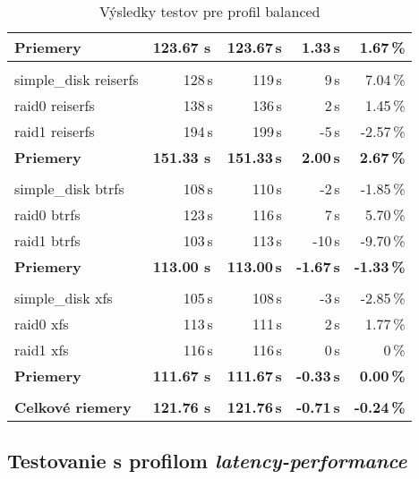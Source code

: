 {\begin{table}[H]
\begin{center}
\begin{tabular}{|l|r r r r|}
    \hline
    \textbf{Priemery} & \textbf{123.67 s}\,& \textbf{123.67\,s} & \textbf{1.33\,s} & \textbf{1.67\,\%} \\
    \hline & \\[-1em]\hline
    simple\_disk reiserfs & 128\,s & 119\,s & 9\,s & 7.04\,\% \\
    raid0 reiserfs & 138\,s & 136\,s & 2\,s & 1.45\,\% \\
    raid1 reiserfs & 194\,s & 199\,s & -5\,s & -2.57\,\% \\
    \hline
    \textbf{Priemery} & \textbf{151.33 s}\,& \textbf{151.33\,s} & \textbf{2.00\,s} & \textbf{2.67\,\%} \\
    \hline & \\[-1em]\hline
    simple\_disk btrfs & 108\,s & 110\,s & -2\,s & -1.85\,\% \\
    raid0 btrfs & 123\,s & 116\,s & 7\,s & 5.70\,\% \\
    raid1 btrfs & 103\,s & 113\,s & -10\,s & -9.70\,\% \\
    \hline
    \textbf{Priemery} & \textbf{113.00 s}\,& \textbf{113.00\,s} & \textbf{-1.67\,s} & \textbf{-1.33\,\%} \\
    \hline & \\[-1em]\hline
    simple\_disk xfs & 105\,s & 108\,s & -3\,s & -2.85\,\% \\
    raid0 xfs & 113\,s & 111\,s & 2\,s & 1.77\,\% \\
    raid1 xfs & 116\,s & 116\,s & 0\,s & 0\,\% \\
    \hline
    \textbf{Priemery} & \textbf{111.67 s}\,& \textbf{111.67\,s} & \textbf{-0.33\,s} & \textbf{0.00\,\%} \\
    \hline & \\[-1em]\hline
    \textbf{Celkové riemery} & \textbf{121.76 s}\,& \textbf{121.76\,s} & \textbf{-0.71\,s} & \textbf{-0.24\,\%} \\
    \hline
\end{tabular}
\caption{Výsledky testov pre profil balanced}
\label{tab:results-xfs}
\end{center}
\end{table}

\subsection{Testovanie s profilom \emph{latency-performance}}

}
